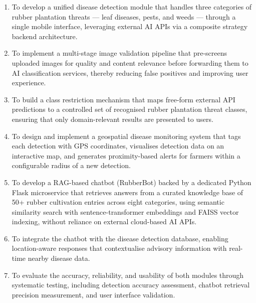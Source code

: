 \begin{enumerate}[label=\arabic*.]
    \item To develop a unified disease detection module that handles three categories of rubber plantation threats --- leaf diseases, pests, and weeds --- through a single mobile interface, leveraging external AI APIs via a composite strategy backend architecture.

    \item To implement a multi-stage image validation pipeline that pre-screens uploaded images for quality and content relevance before forwarding them to AI classification services, thereby reducing false positives and improving user experience.

    \item To build a class restriction mechanism that maps free-form external API predictions to a controlled set of recognised rubber plantation threat classes, ensuring that only domain-relevant results are presented to users.

    \item To design and implement a geospatial disease monitoring system that tags each detection with GPS coordinates, visualises detection data on an interactive map, and generates proximity-based alerts for farmers within a configurable radius of a new detection.

    \item To develop a RAG-based chatbot (RubberBot) backed by a dedicated Python Flask microservice that retrieves answers from a curated knowledge base of 50+ rubber cultivation entries across eight categories, using semantic similarity search with sentence-transformer embeddings and FAISS vector indexing, without reliance on external cloud-based AI APIs.

    \item To integrate the chatbot with the disease detection database, enabling location-aware responses that contextualise advisory information with real-time nearby disease data.

    \item To evaluate the accuracy, reliability, and usability of both modules through systematic testing, including detection accuracy assessment, chatbot retrieval precision measurement, and user interface validation.
\end{enumerate}

\newpage
